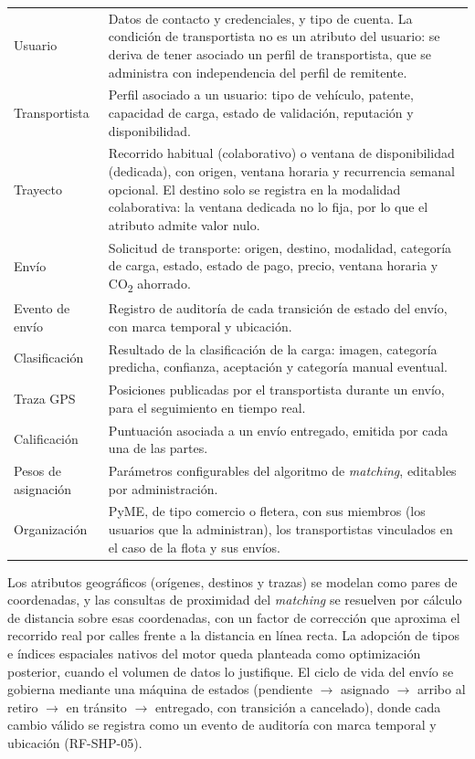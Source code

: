 {\begin{longtable}{p{3.2cm}p{10.4cm}}
    Usuario & Datos de contacto y credenciales, y tipo de cuenta. La condición de transportista no es un atributo del usuario: se deriva de tener asociado un perfil de transportista, que se administra con independencia del perfil de remitente. \\
    Transportista & Perfil asociado a un usuario: tipo de vehículo, patente, capacidad de carga, estado de validación, reputación y disponibilidad. \\
    Trayecto & Recorrido habitual (colaborativo) o ventana de disponibilidad (dedicada), con origen, ventana horaria y recurrencia semanal opcional. El destino solo se registra en la modalidad colaborativa: la ventana dedicada no lo fija, por lo que el atributo admite valor nulo. \\
    Envío & Solicitud de transporte: origen, destino, modalidad, categoría de carga, estado, estado de pago, precio, ventana horaria y CO\textsubscript{2} ahorrado. \\
    Evento de envío & Registro de auditoría de cada transición de estado del envío, con marca temporal y ubicación. \\
    Clasificación & Resultado de la clasificación de la carga: imagen, categoría predicha, confianza, aceptación y categoría manual eventual. \\
    Traza GPS & Posiciones publicadas por el transportista durante un envío, para el seguimiento en tiempo real. \\
    Calificación & Puntuación asociada a un envío entregado, emitida por cada una de las partes. \\
    Pesos de asignación & Parámetros configurables del algoritmo de \emph{matching}, editables por administración. \\
    Organización & PyME, de tipo comercio o fletera, con sus miembros (los usuarios que la administran), los transportistas vinculados en el caso de la flota y sus envíos. \\
    \bottomrule
\end{longtable}

Los atributos geográficos (orígenes, destinos y trazas) se modelan como pares de coordenadas, y las consultas de proximidad del \emph{matching} se resuelven por cálculo de distancia sobre esas coordenadas, con un factor de corrección que aproxima el recorrido real por calles frente a la distancia en línea recta. La adopción de tipos e índices espaciales nativos del motor queda planteada como optimización posterior, cuando el volumen de datos lo justifique. El ciclo de vida del envío se gobierna mediante una máquina de estados (pendiente $\rightarrow$ asignado $\rightarrow$ arribo al retiro $\rightarrow$ en tránsito $\rightarrow$ entregado, con transición a cancelado), donde cada cambio válido se registra como un evento de auditoría con marca temporal y ubicación (RF-SHP-05).

}
